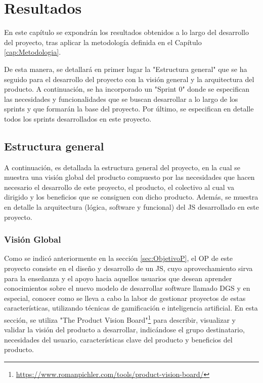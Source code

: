 \chapter{Resultados}
\label{cap:Resultados}

En este capítulo se expondrán los resultados obtenidos a lo largo del desarrollo del proyecto, tras aplicar la metodología definida en el Capítulo \ref{cap:Metodologia}.

De esta manera, se detallará en primer lugar la "Estructura general" que se ha seguido para el desarrollo del proyecto con la visión general y la arquitectura del producto. A continuación, se ha incorporado un "Sprint 0" donde se especifican las necesidades y funcionalidades que se buscan desarrollar a lo largo de los sprints y que formarán la base del proyecto. Por último, se especifican en detalle todos los sprints desarrollados en este proyecto. 

\section{Estructura general}
\label{sec:EstructuraGeneral}

A continuación, es detallada la estructura general del proyecto, en la cual se muestra una visión global del producto compuesto por las necesidades que hacen necesario el desarrollo de este proyecto, el producto, el colectivo al cual va dirigido y los beneficios que se consiguen con dicho producto. Además, se muestra en detalle la arquitectura (lógica, software y funcional) del JS desarrollado en este proyecto.

\subsection{Visión Global}
\label{sec:VisionGlobal}

Como se indicó anteriormente en la sección \ref{sec:ObjetivoP}, el OP de este proyecto consiste en el diseño y desarrollo de un JS, cuyo aprovechamiento sirva para la enseñanza y el apoyo hacia aquellos usuarios que desean aprender conocimientos sobre el nuevo modelo de desarrollar software llamado DGS y en especial, conocer como se lleva a cabo la labor de gestionar proyectos de estas características, utilizando técnicas de gamificación e inteligencia artificial. En esta sección, se utiliza "The Product Vision Board"\footnote{\url{https://www.romanpichler.com/tools/product-vision-board/}} para describir, visualizar y validar la visión del producto a desarrollar, indicándose el grupo destinatario, necesidades del usuario, características clave del producto y beneficios del producto.

